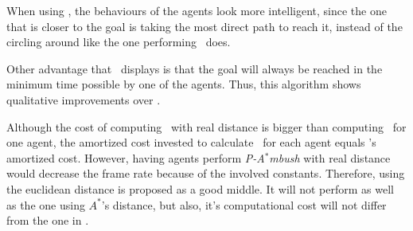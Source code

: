 When using \pambush, the behaviours of the agents look more intelligent, 
since the one that is closer to the goal is taking the most direct path to reach it, instead
of the circling around like the one performing \ambush\ does.

Other advantage that \pambush\ displays is that  the
goal will always be reached in the minimum time possible by 
one of the agents. Thus,  this algorithm shows qualitative
improvements over  \ambush.

Although the cost of computing \pambush\ with real distance is
bigger than computing \ambush\ for one agent, the amortized
cost invested to calculate \pambush\ for each agent equals
\ambush's amortized cost.
However, having agents perform \textit{P-A}$^*$\textit{mbush} with real distance 
would decrease the frame rate because of the involved constants.
Therefore, using the euclidean 
distance is proposed as a good middle. It will not perform as well as 
the one using $A^*$'s distance, but also, it's computational cost will
not differ from the one in \ambush.